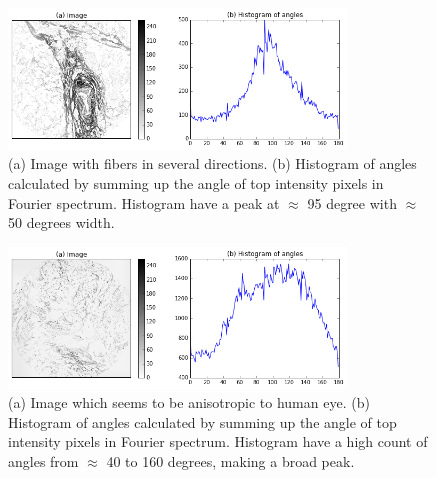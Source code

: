 \begin{figure}[h]
\centering
\includegraphics[width=0.8\textwidth]{hist_sum_several}
\caption{(a) Image with fibers in several directions. (b) Histogram of angles calculated by summing up the angle of top intensity pixels in Fourier spectrum.
Histogram have a peak at $\approx$ 95 degree with $\approx$ 50 degrees width.}
\label{fig:hist_sum_several}
\end{figure}

\begin{figure}[h]
\centering
\includegraphics[width=0.8\textwidth]{hist_sum_anisotropic}
\caption{(a) Image which seems to be anisotropic to human eye. (b) Histogram of angles calculated by summing up the angle of top intensity pixels in Fourier spectrum. Histogram have a high count of angles from $\approx$ 40 to 160 degrees, making a broad peak.}
\label{fig:hist_sum_anisotropic}
\end{figure}